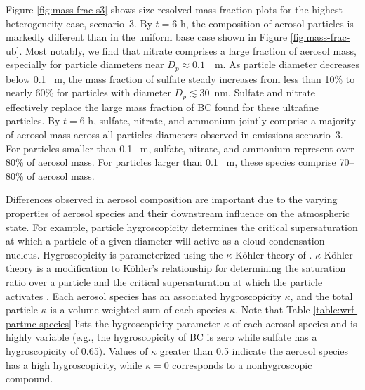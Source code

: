 Figure \ref{fig:mass-frac-s3} shows size-resolved mass fraction plots for the highest heterogeneity case, scenario~3. By $t=6$ h, the composition of aerosol particles is markedly different than in the uniform base case shown in Figure \ref{fig:mass-frac-ub}. Most notably, we find that nitrate comprises a large fraction of aerosol mass, especially for particle diameters near $D_p\approx0.1$~\si{\mu m}. As particle diameter decreases below 0.1 \si{\mu m}, the mass fraction of sulfate steady increases from less than 10\% to nearly 60\% for particles with diameter $D_p  \lesssim 30$~nm. Sulfate and nitrate effectively replace the large mass fraction of BC found for these ultrafine particles. By $t=6$ h, sulfate, nitrate, and ammonium jointly comprise a majority of aerosol mass across all particles diameters observed in emissions scenario~3. For particles smaller than 0.1 \si{\mu m}, sulfate, nitrate, and ammonium represent over 80\% of aerosol mass. For particles larger than 0.1 \si{\mu m}, these species comprise 70--80\% of aerosol mass.

Differences observed in aerosol composition are important due to the varying properties of aerosol species and their downstream influence on the atmospheric state. For example, particle hygroscopicity determines the critical supersaturation at which a particle of a given diameter will active as a cloud condensation nucleus. Hygroscopicity is parameterized using the $\kappa$-Köhler theory of \textcite{petters_single_2007}. $\kappa$-Köhler theory is a modification to Köhler's relationship for determining the saturation ratio over a particle and the critical supersaturation at which the particle activates \parencite{kohler_nucleus_1936}. Each aerosol species has an associated hygroscopicity $\kappa$, and the total particle $\kappa$ is a volume-weighted sum of each species $\kappa$. Note that Table \ref{table:wrf-partmc-species} lists the hygroscopicity parameter $\kappa$ of each aerosol species and is highly variable (e.g., the hygroscopicity of BC is zero while sulfate has a hygroscopicity of 0.65). Values of  $\kappa$ greater than 0.5 indicate the aerosol species has a high hygroscopicity, while $\kappa=0$ corresponds to a nonhygroscopic compound.


